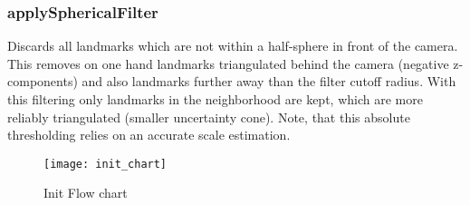 \subsubsection{applySphericalFilter}
\label{sub_sec_sphFilter}
Discards all landmarks which are not within a half-sphere in front of the camera. This removes on one hand landmarks triangulated behind the camera (negative z-components) and also landmarks further away than the filter cutoff radius. With this filtering only landmarks in the neighborhood are kept, which are more reliably triangulated (smaller uncertainty cone). Note, that this absolute thresholding relies on an accurate scale estimation.

\begin{figure}[ht]
	\centering
	\texttt{[image: init\_chart]}
	\caption{Init Flow chart}
	\label{img_flow_init}
\end{figure}